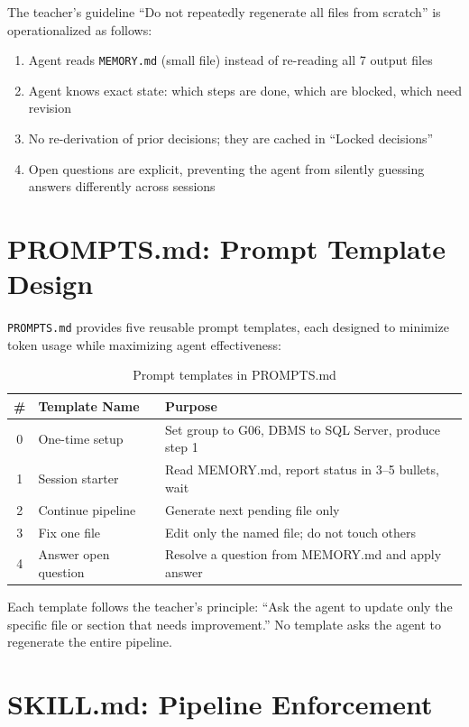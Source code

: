 \documentclass[12pt,a4paper]{article}
\begin{document}
The teacher's guideline ``Do not repeatedly regenerate all files from scratch'' is operationalized as follows:

\begin{enumerate}
    \item Agent reads \texttt{MEMORY.md} (small file) instead of re-reading all 7 output files
    \item Agent knows exact state: which steps are done, which are blocked, which need revision
    \item No re-derivation of prior decisions; they are cached in ``Locked decisions''
    \item Open questions are explicit, preventing the agent from silently guessing answers differently across sessions
\end{enumerate}

\section{PROMPTS.md: Prompt Template Design}

\texttt{PROMPTS.md} provides five reusable prompt templates, each designed to minimize token usage while maximizing agent effectiveness:

\begin{table}[h]
\centering
\begin{tabular}{|c|p{3cm}|p{6cm}|}
\hline
\textbf{\#} & \textbf{Template Name} & \textbf{Purpose} \\
\hline
0 & One-time setup & Set group to G06, DBMS to SQL Server, produce step 1 \\
\hline
1 & Session starter & Read MEMORY.md, report status in 3--5 bullets, wait \\
\hline
2 & Continue pipeline & Generate next pending file only \\
\hline
3 & Fix one file & Edit only the named file; do not touch others \\
\hline
4 & Answer open question & Resolve a question from MEMORY.md and apply answer \\
\hline
\end{tabular}
\caption{Prompt templates in PROMPTS.md}
\end{table}

Each template follows the teacher's principle: ``Ask the agent to update only the specific file or section that needs improvement.'' No template asks the agent to regenerate the entire pipeline.

\section{SKILL.md: Pipeline Enforcement}
\end{document}
